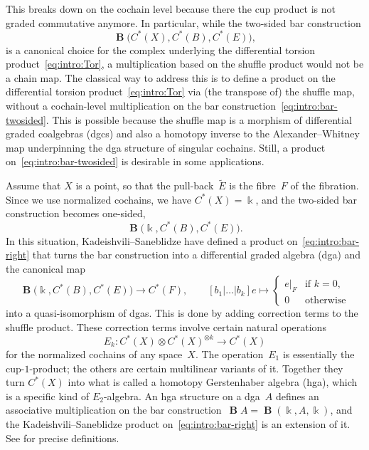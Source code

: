 \documentclass[letterpaper]{amsart}
\numberwithin{equation}{section}
\theoremstyle{plain}
\theoremstyle{definition}
\theoremstyle{remark}
\def\at#1{\left.#1\right|}
\DeclareMathOperator{\BB}{\mathbf{B}}
\def\kk{\Bbbk}
\def\gE{\tilde{E}}
\begin{document}
This breaks down on the cochain level because there the cup product is not graded commutative anymore.
In particular, while the two-sided bar construction
\begin{equation}
  \label{eq:intro:bar-twosided}
  \BB\bigl(C^{*}(X),C^{*}(B),C^{*}(E)\bigr),
\end{equation}
is a canonical choice for the complex underlying the differential torsion product~\eqref{eq:intro:Tor},
a multiplication based on the shuffle product would not be a chain map.
The classical way to address this is to define a product on the differential torsion product~\eqref{eq:intro:Tor}
via (the transpose of) the shuffle map, without a cochain-level multiplication on the bar construction~\eqref{eq:intro:bar-twosided}.
This is possible because the shuffle map is a morphism of differential graded coalgebras (dgcs)
and also a homotopy inverse to the Alexander--Whitney map
underpinning the dga structure of singular cochains.
Still, a product on~\eqref{eq:intro:bar-twosided} is desirable in some applications.

Assume that $X$ is a point, so that the pull-back~$\gE$ is the fibre~$F$ of the fibration.
Since we use normalized cochains, we have $C^{*}(X)=\kk$, and the two-sided bar construction becomes one-sided,
\begin{equation}
  \label{eq:intro:bar-right}
  \BB\bigl(\kk,C^{*}(B),C^{*}(E)\bigr).
\end{equation}
In this situation, Kadeishvili--Saneblidze have defined a product on~\eqref{eq:intro:bar-right}
that turns the bar construction into a differential graded algebra (dga) and the canonical map
\begin{equation}
  \BB\bigl(\kk,C^{*}(B),C^{*}(E)\bigr) \to C^{*}(F),
  \qquad
  [b_{1}|\dots|b_{k}]e \mapsto \begin{cases}
    \at{e}_{F} & \text{if $k=0$,} \\
    0 & \text{otherwise}
  \end{cases}
\end{equation}
into a quasi-isomorphism of dgas. This is done by adding correction terms to the shuffle product.
These correction terms involve certain natural operations
\begin{equation}
  E_{k}\colon C^{*}(X) \otimes C^{*}(X)^{\otimes k} \to C^{*}(X)
\end{equation}
for the normalized cochains of any space~$X$. The operation~$E_{1}$ is essentially the cup-$1$-product;
the others are certain multilinear variants of it. Together they turn $C^{*}(X)$
into what is called a homotopy Gerstenhaber algebra (hga), which is a specific kind of $E_{2}$-algebra.
An hga structure on a dga~$A$ defines an associative multiplication on the bar construction~$\BB A=\BB(\kk,A,\kk)$,
and the Kadeishvili--Saneblidze product on~\eqref{eq:intro:bar-right} is an extension of it.
See  for precise definitions.
\end{document}
